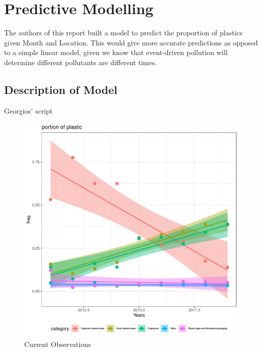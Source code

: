 \documentclass[10pt]{article}\usepackage[]{graphicx}\usepackage[]{color}
\makeatletter
\def\maxwidth{ %
  \ifdim\Gin@nat@width>\linewidth
    \linewidth
  \else
    \Gin@nat@width
  \fi
}
\newenvironment{knitrout}{}{} %
\makeatother
\begin{document}
\pagebreak
\section{Predictive Modelling}
The authors of this report built a model to predict the proportion of plastics given Month and Location. This would give more accurate predictions as opposed to a simple linear model, given we know that event-driven pollution will determine different pollutants are different times.

\subsection{Description of Model}

Georgios' script


\begin{figure}[H] %
\begin{center}
\begin{knitrout}
\color{fgcolor}
\includegraphics[width=\maxwidth]{figure/unnamed-chunk-19-1} 

\end{knitrout}
\caption {Current Observations}
\label{figH}
\end {center}
\end {figure}
\end{document}
